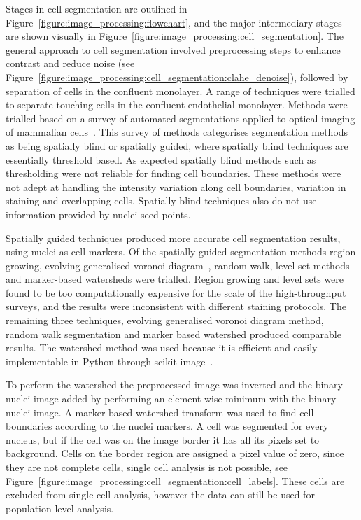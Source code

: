 Stages in cell segmentation are outlined in Figure~\ref{figure:image_processing:flowchart}, and the major intermediary stages are shown visually in Figure~\ref{figure:image_processing:cell_segmentation}. The general approach to cell segmentation involved preprocessing steps to enhance contrast and reduce noise (see Figure~\ref{figure:image_processing:cell_segmentation:clahe_denoise}), followed by separation of cells in the confluent monolayer. A range of techniques were trialled to separate touching cells in the confluent endothelial monolayer. Methods were trialled based on a survey of automated segmentations applied to optical imaging of mammalian cells~\cite{Bajcsy2015}. This survey of methods categorises segmentation methods as being spatially blind or spatially guided, where spatially blind techniques are essentially threshold based. As expected spatially blind methods such as thresholding were not reliable for finding cell boundaries. These methods were not adept at handling the intensity variation along cell boundaries, variation in staining and overlapping cells. Spatially blind techniques also do not use information provided by nuclei seed points.

Spatially guided techniques produced more accurate cell segmentation results, using nuclei as cell markers. Of the spatially guided segmentation methods region growing, evolving generalised voronoi diagram~\cite{Yu2010}, random walk, level set methods and marker-based watersheds were trialled. Region growing and level sets were found to be too computationally expensive for the scale of the high-throughput surveys, and the results were inconsistent with different staining protocols. The remaining three techniques, evolving generalised voronoi diagram method, random walk segmentation and marker based watershed produced comparable results. The watershed method was used because it is efficient and easily implementable in Python through scikit-image~\cite{VanderWalt2014}.

To perform the watershed the preprocessed image was inverted and the binary nuclei image added by performing an element-wise minimum with the binary nuclei image. A marker based watershed transform was used to find cell boundaries according to the nuclei markers. A cell was segmented for every nucleus, but if the cell was on the image border it has all its pixels set to background. Cells on the border region are assigned a pixel value of zero, since they are not complete cells, single cell analysis is not possible, see Figure~\ref{figure:image_processing:cell_segmentation:cell_labels}. These cells are excluded from single cell analysis, however the data can still be used for population level analysis.

